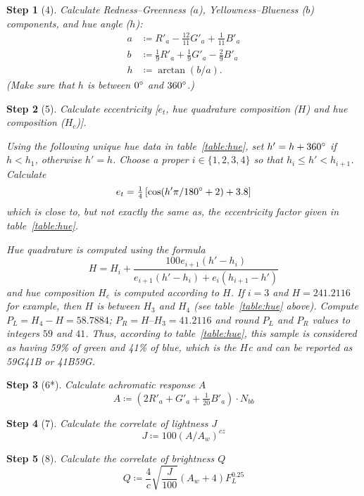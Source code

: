\documentclass[twocolumn]{scrartcl}
\theoremstyle{named}
\newtheorem*{step}{Step}
\begin{document}
\begin{step}[4]
Calculate Redness--Greenness ($a$), Yellowness--Blueness ($b$) components,
and hue angle ($h$):
\begin{align*}
  a&\coloneqq R'_a - \tfrac{12}{11} G'_a + \tfrac{1}{11} B'_a\\
  b&\coloneqq \tfrac{1}{9} R'_a + \tfrac{1}{9} G'_a - \tfrac{2}{9} B'_a\\
  h&\coloneqq \arctan(b/a).
\end{align*}
(Make sure that $h$ is between $0\degree$ and $360\degree$.)
\end{step}

\begin{step}[5]
Calculate eccentricity [$e_t$, hue quadrature composition
($H$) and hue composition ($H_c$)].

Using the following unique hue data in table~\ref{table:hue}, set
$h'= h + 360\degree$ if $h < h_1$, otherwise $h'=h$.
Choose a proper $i\in\{1,2,3,4\}$ so that $h_i\le h' < h_{i+1}$.
Calculate
\[
  e_t = \tfrac{1}{4}
  \left[
    \cos(h'\pi/180\degree + 2) + 3.8
  \right]
\]
which is close to, but not exactly the same as, the eccentricity factor given
in table~\ref{table:hue}.

Hue quadrature is computed using the formula
\[
  H = H_i + \frac{100 e_{i+1} (h'-h_i)}{e_{i+1}(h'-h_i) + e_i (h_{i+1}-h')}
\]
and hue composition $H_c$ is computed according to $H$.  If $i=3$ and $H =
241.2116$ for example, then $H$ is between $H_3$ and $H_4$ (see
table~\ref{table:hue} above). Compute $P_L=H_4-H = 58.7884$; $P_R = H – H_3 =
41.2116$ and round $P_L$ and $P_R$ values to integers $59$ and $41$. Thus,
according to table~\ref{table:hue}, this sample is considered as having 59\%
of green and 41\% of blue, which is the $H$c and can be reported as 59G41B or
41B59G.
\end{step}

\begin{step}[6*]
Calculate achromatic response $A$
\[
  A\coloneqq (2 R'_a + G'_a + \tfrac{1}{20} B'_a) \cdot N_{bb}
  \]
\end{step}

\begin{step}[7]
Calculate the correlate of lightness $J$
\[
  J \coloneqq 100 {(A / A_w)}^{cz}
  \]
\end{step}

\begin{step}[8]
  Calculate the correlate of brightness $Q$
  \[
    Q \coloneqq \frac{4}{c} \sqrt{\frac{J}{100}} (A_w+4) F_L^{0.25}
    \]
\end{step}
\end{document}

